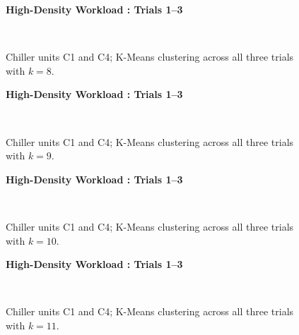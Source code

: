 \begin{figure}[!h]
\centerline{\bfseries\large High-Density Workload : Trials 1--3}\\
\caption{Chiller units C1 and C4; K-Means clustering across all three trials with $k=8$.}
\end{figure}
\begin{figure}[!h]
\centerline{\bfseries\large High-Density Workload : Trials 1--3}\\
\caption{Chiller units C1 and C4; K-Means clustering across all three trials with $k=9$.}
\end{figure}
\begin{figure}[!h]
\centerline{\bfseries\large High-Density Workload : Trials 1--3}\\
\caption{Chiller units C1 and C4; K-Means clustering across all three trials with $k=10$.}
\end{figure}
\begin{figure}[!h]
\centerline{\bfseries\large High-Density Workload : Trials 1--3}\\
\caption{Chiller units C1 and C4; K-Means clustering across all three trials with $k=11$.}
\end{figure}
